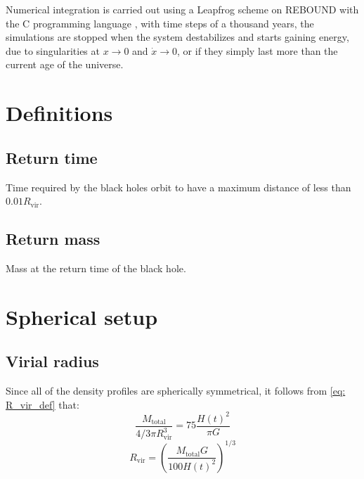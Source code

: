		Numerical integration is carried out using a Leapfrog scheme on REBOUND with the C programming language \cite{larson2017modeling}, with time steps of a thousand years, the simulations are stopped when the system destabilizes and starts gaining energy, due to singularities at $x \rightarrow 0$ and $\dot{x} \rightarrow 0$, or if they simply last more than the current age of the universe. 
		
	\section{Definitions}
		
		\subsection{Return time}
			Time required by the black holes orbit to have a maximum distance of less than $0.01R_\text{vir}$.
			
		\subsection{Return mass}
			Mass at the return time of the black hole.
			
	\section{Spherical setup}
	\subsection{Virial radius}
		Since all of the density profiles are spherically symmetrical, it follows from \autoref{eq: R_vir_def} that:  
		\begin{equation}
		\dfrac{M_\text{total}}{4/3\pi R_\text{vir}^3} = 75\dfrac{H(t)^2}{\pi G}
		\end{equation}
		\begin{equation}\label{eq: r_vir}
		R_\text{vir} = \left({\dfrac{M_\text{total}G}{100 H(t)^2}}\right)^{1/3}
		\end{equation}
	
